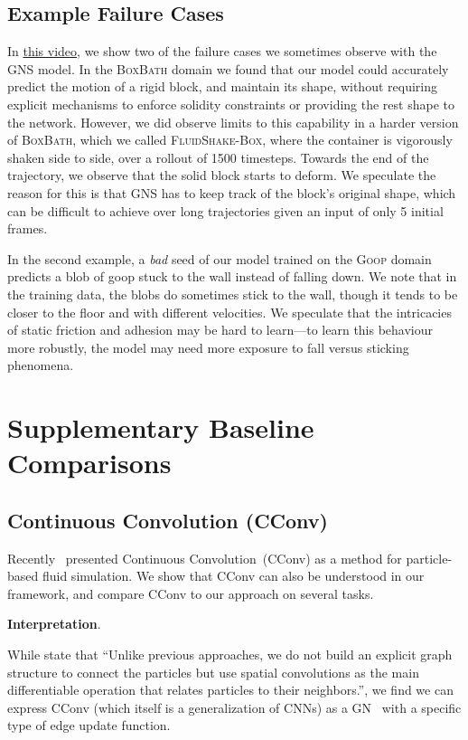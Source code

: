 \documentclass{article}
\newcommand{\xhdr}[1]{{\noindent\bfseries #1}.}
\newcommand\domain[1]{\textsc{#1}}
\newcommand\vidfail[1]{\href{http://tny.sh/Tc01u0R}{#1}}
\begin{document}
\subsection{Example Failure Cases}
In \vidfail{this video}, we show two of the failure cases we sometimes observe with the GNS model. In the \domain{BoxBath} domain we found that our model could accurately predict the motion of a rigid block, and maintain its shape, without requiring explicit mechanisms to enforce solidity constraints or providing the rest shape to the network. However, we did observe limits to this capability in a harder version of \domain{BoxBath}, which we called \domain{FluidShake-Box}, where the container is vigorously shaken side to side, over a rollout of 1500 timesteps. Towards the end of the trajectory, we observe that the solid block starts to deform. 
We speculate the reason for this is that GNS has to keep track of the block's original shape, which can be difficult to achieve over long trajectories given an input of only 5 initial frames.

In the second example, a \emph{bad} seed of our model trained on the \domain{Goop} domain predicts a blob of goop stuck to the wall instead of falling down. We note that in the training data, the blobs do sometimes stick to the wall, though it tends to be closer to the floor and with different velocities. We speculate that the intricacies of static friction and adhesion may be hard to learn---to learn this behaviour more robustly, the model may need more exposure to fall versus sticking phenomena.


\section{Supplementary Baseline Comparisons}
\label{supp:sec:baselines}

\subsection{Continuous Convolution (CConv)}
Recently~\citet{ummenhofer2020lagrangian} presented Continuous Convolution~(CConv) as a method for particle-based fluid simulation. We show that CConv can also be understood in our framework, and compare CConv to our approach on several tasks.

\xhdr{Interpretation}

\nopagebreak
%
While \citet{ummenhofer2020lagrangian} state that ``Unlike previous approaches, we do not build an explicit graph structure to connect the particles but use spatial convolutions as the main differentiable operation that relates particles to their neighbors.'', we find we can express CConv  (which itself is a generalization of CNNs) as a GN~\cite{battaglia2018relational} with a specific type of edge update function.
\end{document}
